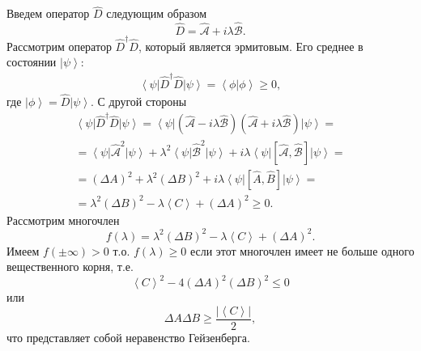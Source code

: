 Введем оператор $\hat{D}$ следующим образом
\begin{equation}
\hat{D} = \hat{\mathcal{A}} + i \lambda \hat{\mathcal{B}}.
\nonumber
\end{equation}
Рассмотрим оператор $\hat{D}^{\dag}\hat{D}$, который является
эрмитовым. Его среднее в состоянии $\left|\psi\right>$:
\begin{eqnarray}
\left<\psi\right|\hat{D}^{\dag}\hat{D}\left|\psi\right> = 
\left<\phi\right|\left.\phi\right> \ge 0,
\nonumber
\end{eqnarray}
где
$\left|\phi\right> = \hat{D}\left|\psi\right>$. С другой стороны 
\begin{eqnarray}
\left<\psi\right|\hat{D}^{\dag}\hat{D}\left|\psi\right> = 
\left<\psi\right|\left(\hat{\mathcal{A}} - i \lambda \hat{\mathcal{B}}\right)
\left(\hat{\mathcal{A}} + i \lambda \hat{\mathcal{B}}\right)\left|\psi\right> =
\nonumber \\
=
\left<\psi\right|\hat{\mathcal{A}}^2\left|\psi\right> +
\lambda^2\left<\psi\right|\hat{\mathcal{B}}^2\left|\psi\right> +
i \lambda 
\left<\psi\right|
\left[ \mathcal{\hat{A}}, \mathcal{\hat{B}}\right]
\left|\psi\right>
 = 
\nonumber \\
=
\left(\Delta A\right)^2 + \lambda^2 \left(\Delta B\right)^2 +
i \lambda 
\left<\psi\right|
\left[ \hat{A}, \hat{B}\right]
\left|\psi\right> = 
\nonumber \\
=
\lambda^2 \left(\Delta B\right)^2 - 
\lambda \left<C\right> + \left(\Delta A\right)^2 \ge 0.
\nonumber
\end{eqnarray}
Рассмотрим многочлен 
\[
f\left(\lambda\right) = \lambda^2 \left(\Delta B\right)^2 - 
\lambda \left<C\right> + \left(\Delta A\right)^2.
\]
Имеем $f\left( \pm \infty \right) > 0$ т.о. 
$f\left(\lambda\right) \ge 0$ если этот многочлен имеет не больше
одного вещественного корня, т.е.
\[
\left<C\right>^2 - 4 \left(\Delta A\right)^2 \left(\Delta B\right)^2
\le 0
\]
или
\begin{equation}
  \Delta A \Delta B \ge \frac{\left|\left< C \right>\right|}{2},
  \label{eqAddHeisenbergUncertaintyPrinciple}
\end{equation}
что представляет собой неравенство Гейзенберга. 

